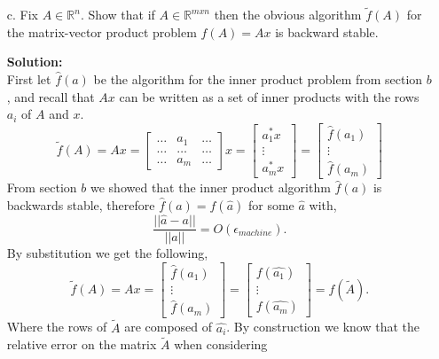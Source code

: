 \documentclass[12pt]{article}
\makeatletter
\theoremstyle{homework}
\newenvironment{exercise}[1]
{\def\@currentlabel{#1}\exercisecore}
{\endexercisecore}
\newcommand{\localhead}[1]{\par\smallskip\noindent\textbf{#1}\nobreak\\}%
\newcommand\solution{\localhead{Solution:}}
\newcommand{\Reals}{\ensuremath{\mathbb R}}
\newcommand{\emach}{\ensuremath{\epsilon_{machine}}}
\let\RR\Reals
\makeatother
\begin{document}
\begin{exercise}{P21}
\begin{enumerate}
  \item[c.] Fix $A \in \RR^n$. Show that if $A \in \RR^{mxn}$ then the obvious algorithm $\tilde{f}(A)$ for the 
  matrix-vector product problem $f(A) = Ax$ is backward stable.\\
  \solution First let $\hat{f}(a)$ be the algorithm for the inner product problem from section $b$, and 
  recall that $Ax$ can be written as a set of inner products with the rows $a_i$ of $A$ and $x$.  
  \begin{equation*}
    \tilde{f}(A) = Ax =
     \begin{bmatrix}
      \dots & a_1 & \dots\\
      \hline
      \dots & \dots & \dots\\
      \hline
      \dots & a_m & \dots
    \end{bmatrix}
    x = 
    \begin{bmatrix}
      a_1^*x\\
      \vdots\\
      a_m^*x
    \end{bmatrix}
     = 
     \begin{bmatrix}
      \hat{f}(a_1)\\
      \vdots\\
      \hat{f}(a_m)
    \end{bmatrix}
  \end{equation*}  
  From section $b$ we showed that the inner product algorithm $\hat{f}(a)$ is backwards stable, therefore $\hat{f}(a) = f(\hat{a})$ for some 
  $\hat{a}$ with,
  \begin{equation*}
    \dfrac{||\hat{a} - a||}{||a||} = O(\emach).
  \end{equation*} 
  By substitution we get the following, 
  \begin{equation*}
    \tilde{f}(A) = Ax =
     \begin{bmatrix}
      \hat{f}(a_1)\\
      \vdots\\
      \hat{f}(a_m)
    \end{bmatrix} = 
    \begin{bmatrix}  
      f(\hat{a_1})\\
      \vdots\\
      f(\hat{a_m})
    \end{bmatrix} = 
    f(\tilde{A}).
  \end{equation*}  
  Where the rows of $\tilde{A}$ are composed of $\hat{a_i}$. By construction we know that the relative error on the matrix $\tilde{A}$ when considering 

\end{enumerate}
\end{exercise}
\end{document}
